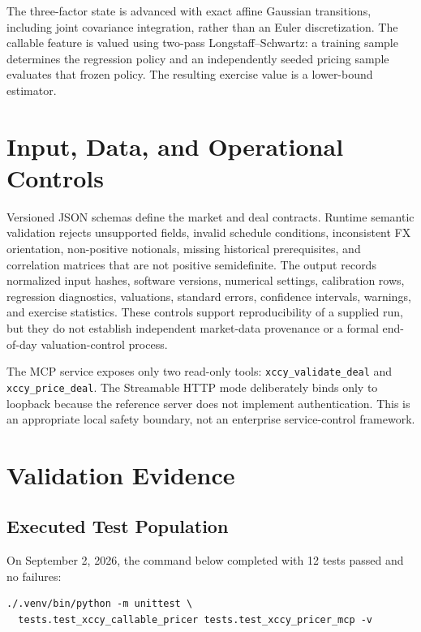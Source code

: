 \documentclass[conference]{IEEEtran}
\begin{document}
The three-factor state is advanced with exact affine Gaussian transitions, including joint covariance integration, rather than an Euler discretization. The callable feature is valued using two-pass Longstaff--Schwartz: a training sample determines the regression policy and an independently seeded pricing sample evaluates that frozen policy. The resulting exercise value is a lower-bound estimator.

\section{Input, Data, and Operational Controls}

Versioned JSON schemas define the market and deal contracts. Runtime semantic validation rejects unsupported fields, invalid schedule conditions, inconsistent FX orientation, non-positive notionals, missing historical prerequisites, and correlation matrices that are not positive semidefinite. The output records normalized input hashes, software versions, numerical settings, calibration rows, regression diagnostics, valuations, standard errors, confidence intervals, warnings, and exercise statistics. These controls support reproducibility of a supplied run, but they do not establish independent market-data provenance or a formal end-of-day valuation-control process.

The MCP service exposes only two read-only tools: \texttt{xccy\_validate\_deal} and \texttt{xccy\_price\_deal}. The Streamable HTTP mode deliberately binds only to loopback because the reference server does not implement authentication. This is an appropriate local safety boundary, not an enterprise service-control framework.

\section{Validation Evidence}

\subsection{Executed Test Population}

On September 2, 2026, the command below completed with 12 tests passed and no failures:
\begin{lstlisting}
./.venv/bin/python -m unittest \
  tests.test_xccy_callable_pricer tests.test_xccy_pricer_mcp -v
\end{lstlisting}
\end{document}
